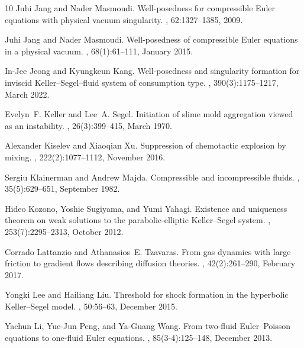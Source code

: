 \documentclass[11pt]{article}
\theoremstyle{plain}
\theoremstyle{definition}
\theoremstyle{remark}
\numberwithin{equation}{section}
\begin{document}
\begin{thebibliography}{10}
Juhi Jang and Nader Masmoudi.
\newblock Well-posedness for compressible Euler equations with physical vacuum singularity.
, 62:1327--1385, 2009.

Juhi Jang and Nader Masmoudi.
\newblock Well-posedness of compressible Euler equations in a physical vacuum.
, 68(1):61--111, January 2015.

In-Jee Jeong and Kyungkeun Kang.
\newblock Well-posedness and singularity formation for inviscid Keller--Segel--fluid system of consumption type.
, 390(3):1175--1217, March 2022.

Evelyn~F. Keller and Lee~A. Segel.
\newblock Initiation of slime mold aggregation viewed as an instability.
, 26(3):399--415, March 1970.

Alexander Kiselev and Xiaoqian Xu.
\newblock Suppression of chemotactic explosion by mixing.
, 222(2):1077--1112, November 2016.

Sergiu Klainerman and Andrew Majda.
\newblock Compressible and incompressible fluids.
, 35(5):629--651, September 1982.

Hideo Kozono, Yoshie Sugiyama, and Yumi Yahagi.
\newblock Existence and uniqueness theorem on weak solutions to the parabolic-elliptic Keller--Segel system.
, 253(7):2295--2313, October 2012.

Corrado Lattanzio and Athanasios~E. Tzavaras.
\newblock From gas dynamics with large friction to gradient flows describing diffusion theories.
, 42(2):261--290, February 2017.

Yongki Lee and Hailiang Liu.
\newblock Threshold for shock formation in the hyperbolic Keller--Segel model.
, 50:56--63, December 2015.

Yachun Li, Yue-Jun Peng, and Ya-Guang Wang.
\newblock From two-fluid Euler--Poisson equations to one-fluid Euler equations.
, 85(3-4):125--148, December 2013.


\end{thebibliography}
\end{document}

